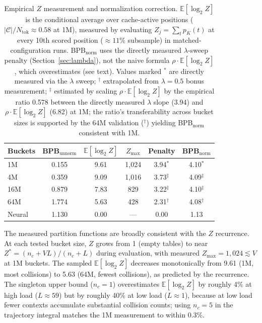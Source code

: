 \documentclass[11pt]{article}
\newcommand{\E}{\mathbb{E}}
\begin{document}
\begin{table}[h]
\centering
\caption{Empirical $Z$ measurement and normalization correction. $\E[\log_2 Z]$ is the conditional average over cache-active positions ($|\mathcal{C}|/N_{\text{tok}} \approx 0.58$ at 1M), measured by evaluating $Z_j = \sum_t p_K(t)$ at every 10th scored position (${\approx}11\%$ subsample) in matched-configuration runs. BPB$_{\text{norm}}$ uses the directly measured $\lambda$-sweep penalty (Section~\ref{sec:lambda}), not the naive formula $\rho \cdot \E[\log_2 Z]$, which overestimates (see text). Values marked $^*$ are directly measured via the $\lambda$ sweep; $^{\dagger}$ extrapolated from $\lambda = 0.5$ bonus measurement; $^{\ddagger}$ estimated by scaling $\rho \cdot \E[\log_2 Z]$ by the empirical ratio 0.578 between the directly measured $\lambda$ slope (3.94) and $\rho \cdot \E[\log_2 Z]$ (6.82) at 1M; the ratio's transferability across bucket sizes is supported by the 64M validation ($^{\dagger}$) yielding BPB$_{\text{norm}}$ consistent with 1M.}
\label{tab:normalized}
\begin{tabular}{lccccc}
\toprule
Buckets & BPB$_{\text{unnorm}}$ & $\E[\log_2 Z]$ & $Z_{\max}$ & Penalty & BPB$_{\text{norm}}$ \\
\midrule
1M & 0.155 & 9.61 & 1,024 & 3.94$^*$ & 4.10$^*$ \\
4M & 0.359 & 9.09 & 1,016 & 3.73$^{\ddagger}$ & 4.09$^{\ddagger}$ \\
16M & 0.879 & 7.83 & 829 & 3.22$^{\ddagger}$ & 4.10$^{\ddagger}$ \\
64M & 1.774 & 5.63 & 428 & 2.31$^{\dagger}$ & 4.08$^{\dagger}$ \\
\midrule
Neural & 1.130 & 0.00 & --- & 0.00 & 1.13 \\
\bottomrule
\end{tabular}
\end{table}

The measured partition functions are broadly consistent with the $Z$ recurrence. At each tested bucket size, $Z$ grows from 1 (empty tables) to near $Z^* = (n_c + VL)/(n_c + L)$ during evaluation, with measured $Z_{\max} = 1{,}024 \lesssim V$ at 1M buckets. The sampled $\E[\log_2 Z]$ decreases monotonically from 9.61 (1M, most collisions) to 5.63 (64M, fewest collisions), as predicted by the recurrence. The singleton upper bound ($n_c = 1$) overestimates $\E[\log_2 Z]$ by roughly 4\% at high load ($L \approx 59$) but by roughly 40\% at low load ($L \approx 1$), because at low load fewer contexts accumulate substantial collision counts; using $n_c = 5$ in the trajectory integral matches the 1M measurement to within 0.3\%.
\end{document}
